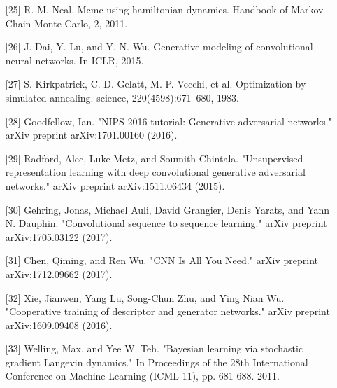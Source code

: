 \begin{itemize}
\item [{[}25{]}] R. M. Neal. Mcmc using hamiltonian dynamics. Handbook of Markov Chain Monte Carlo, 2, 2011.
\item [{[}26{]}] J. Dai, Y. Lu, and Y. N. Wu. Generative modeling of convolutional neural networks. In ICLR, 2015.
\item [{[}27{]}] S. Kirkpatrick, C. D. Gelatt, M. P. Vecchi, et al. Optimization by simulated annealing. science, 220(4598):671–680, 1983.
\item [{[}28{]}] Goodfellow, Ian. "NIPS 2016 tutorial: Generative adversarial networks." arXiv preprint arXiv:1701.00160 (2016).
\item [{[}29{]}] Radford, Alec, Luke Metz, and Soumith Chintala. "Unsupervised representation learning with deep convolutional generative adversarial networks." arXiv preprint arXiv:1511.06434 (2015).
\item [{[}30{]}] Gehring, Jonas, Michael Auli, David Grangier, Denis Yarats, and Yann N. Dauphin. "Convolutional sequence to sequence learning." arXiv preprint arXiv:1705.03122 (2017).
\item [{[}31{]}] Chen, Qiming, and Ren Wu. "CNN Is All You Need." arXiv preprint arXiv:1712.09662 (2017).
\item [{[}32{]}] Xie, Jianwen, Yang Lu, Song-Chun Zhu, and Ying Nian Wu. "Cooperative training of descriptor and generator networks." arXiv preprint arXiv:1609.09408 (2016).
\item [{[}33{]}] Welling, Max, and Yee W. Teh. "Bayesian learning via stochastic gradient Langevin dynamics." In Proceedings of the 28th International Conference on Machine Learning (ICML-11), pp. 681-688. 2011.
\end{itemize}

